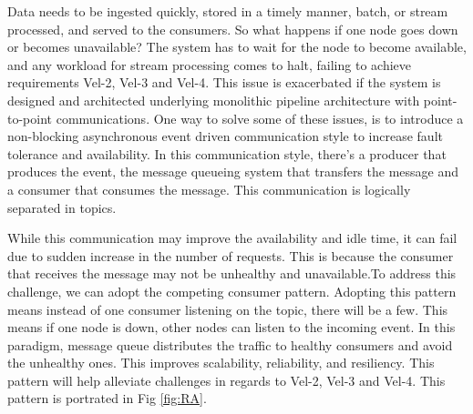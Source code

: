 \documentclass[a4paper,11pt,article,oneside]{memoir}
\begin{document}
Data needs to be ingested quickly, stored in a timely manner, batch, or stream processed, and served to the consumers. So what happens if one node goes down or becomes unavailable? The system has to wait for the node to become available, and any workload for stream processing comes to halt, failing to achieve requirements Vel-2, Vel-3 and Vel-4. This issue is exacerbated if the system is designed and architected underlying monolithic pipeline architecture with point-to-point communications. One way to solve some of these issues, is to introduce a non-blocking asynchronous event driven communication style to increase fault tolerance and availability. In this communication style, there's a producer that produces the event, the message queueing system that transfers the message and a consumer that consumes the message. This communication is logically separated in topics. 

While this communication may improve the availability and idle time, it can fail due to sudden increase in the number of requests. This is because the consumer that receives the message may not be unhealthy and unavailable.To address this challenge, we can adopt the competing consumer pattern. Adopting this pattern means instead of one consumer listening on the topic, there will be a few. This means if one node is down, other nodes can listen to the incoming event. In this paradigm, message queue distributes the traffic to healthy consumers and avoid the unhealthy ones. This improves scalability, reliability, and resiliency. This pattern will help alleviate challenges in regards to Vel-2, Vel-3 and Vel-4. This pattern is portrated in Fig \ref{fig:RA}.








\end{document}
